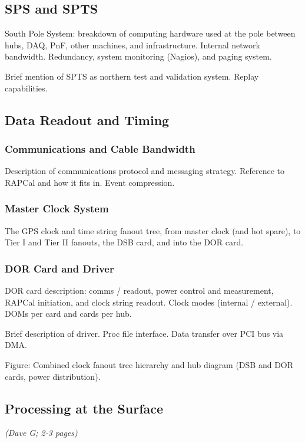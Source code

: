 \subsection{SPS and SPTS}

South Pole System: breakdown of computing hardware used at the pole between
hubs, DAQ, PnF, other machines, and infrastructure.  Internal network
bandwidth.  Redundancy, system monitoring (Nagios), and paging system.

Brief mention of SPTS as northern test and validation system.  Replay
capabilities.  

\subsection{Data Readout and Timing}
\subsubsection{Communications and Cable Bandwidth}

Description of communications protocol and messaging strategy.  Reference
to RAPCal and how it fits in.  Event compression.


\subsubsection{Master Clock System}

The GPS clock and time string fanout tree, from master clock (and hot
spare), to Tier I and Tier II fanouts, the DSB card, and into the DOR card.

\subsubsection{DOR Card and Driver}

DOR card description: comms / readout, power control and measurement,
RAPCal initiation, and clock string readout.  Clock modes (internal /
external).  DOMs per card and cards per hub.

Brief description of driver.  Proc file interface.  Data transfer over PCI
bus via DMA.  

Figure: Combined clock fanout tree hierarchy and hub diagram (DSB and DOR
cards, power distribution).

\subsection{Processing at the Surface}
\textsl{(Dave G; 2-3 pages)}

